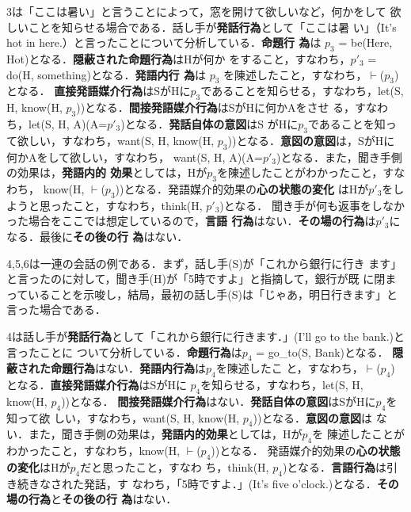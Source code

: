 3は「ここは暑い」と言うことによって，窓を開けて欲しいなど，何かをして
欲しいことを知らせる場合である．話し手が{\bf 発話行為}として「ここは暑
い」（It's hot in here.）と言ったことについて分析している．{\bf 命題行
為}は $p_{3}$ = be(Here, Hot)となる．{\bf 隠蔽された命題行為}はHが何か
をすること，すなわち，$p'_{3}$ = do(H, something)となる．{\bf 発語内行
為}は $p_{3}$ を陳述したこと，すなわち，$\vdash$($p_{3}$)となる．{\bf 
直接発語媒介行為}はSがHに$p_{3}$であることを知らせる，すなわち，let(S,
H, know(H, $p_{3}$))となる．{\bf 間接発語媒介行為}はSがHに何かAをさせ
る，すなわち，let(S, H, A)(A=$p'_{3}$)となる．{\bf 発話自体の意図}はS
がHに$p_{3}$であることを知って欲しい，すなわち，want(S, H, know(H,
$p_{3}$))となる．{\bf 意図の意図}は，SがHに何かAをして欲しい，すなわち，
want(S, H, A)(A=$p'_{3}$)となる．また，聞き手側の効果は，{\bf 発語内的
効果}としては，Hが$p_{3}$を陳述したことがわかったこと，すなわち，
know(H, $\vdash$($p_{3}$))となる．発語媒介的効果の{\bf 心の状態の変化}
はHが$p'_{3}$をしようと思ったこと，すなわち，think(H, $p'_{3}$)となる．
聞き手が何も返事をしなかった場合をここでは想定しているので，{\bf 言語
行為}はない．{\bf その場の行為}は$p'_{3}$になる．最後に{\bf その後の行
為}はない．

4,5,6は一連の会話の例である．まず，話し手(S)が「これから銀行に行き
ます」と言ったのに対して，聞き手(H)が「5時ですよ」と指摘して，銀行が既
に閉まっていることを示唆し，結局，最初の話し手(S)は「じゃあ，明日行きます」と
言った場合である．

4は話し手が{\bf 発話行為}として「これから銀行に行きます．」(I'll go to the bank.)と言ったことに
ついて分析している．{\bf 命題行為}は$p_{4}$ = go\_to(S, Bank)となる．
{\bf 隠蔽された命題行為}はない．{\bf 発語内行為}は$p_{4}$を陳述したこ
と，すなわち，$\vdash$($p_{4}$)となる．{\bf 直接発語媒介行為}はSがHに
$p_{4}$を知らせる，すなわち，let(S, H, know(H, $p_{4}$))となる．{\bf 
間接発語媒介行為}はない．{\bf 発話自体の意図}はSがHに$p_{4}$を知って欲
しい，すなわち，want(S, H, know(H, $p_{4}$))となる．{\bf 意図の意図}は
ない．また，聞き手側の効果は，{\bf 発語内的効果}としては，Hが$p_{4}$を
陳述したことがわかったこと，すなわち，know(H, $\vdash$($p_{4}$))となる．
発語媒介的効果の{\bf 心の状態の変化}はHが$p_{4}$だと思ったこと，すなわ
ち，think(H, $p_{4}$)となる．{\bf 言語行為}は引き続きなされた発話，す
なわち，「5時ですよ．」(It's five o'clock.)となる．{\bf その場の行為}と{\bf その後の行
為}はない．

